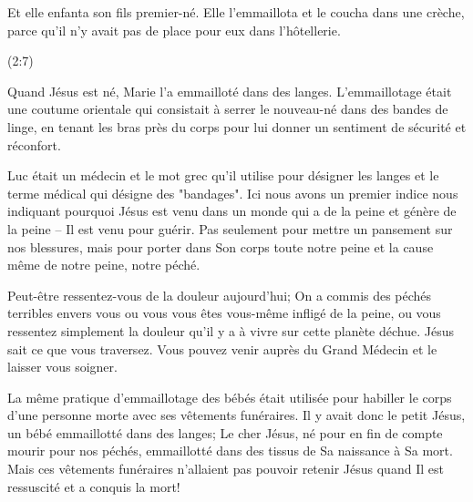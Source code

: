 
\epigraph{%
Et elle enfanta son fils premier-né. Elle l'emmaillota et le coucha dans une crèche, parce qu'il n'y avait pas de place pour eux dans l'hôtellerie.}{(2:7)}

Quand Jésus est né, Marie l'a emmailloté dans des langes. L'emmaillotage était une coutume orientale qui consistait à serrer le nouveau-né dans des bandes de linge, en tenant les bras près du corps pour lui donner un sentiment de sécurité et réconfort.

Luc était un médecin et le mot grec qu'il utilise pour désigner les langes et le terme médical qui désigne des "bandages". Ici nous avons un premier indice nous indiquant pourquoi Jésus est venu dans un monde qui a de la peine et génère de la peine – Il est venu pour guérir. Pas seulement pour mettre un pansement sur nos blessures, mais pour porter dans Son corps toute notre peine et la cause même de notre peine, notre péché.

Peut-être ressentez-vous de la douleur aujourd'hui; On a commis des péchés terribles envers vous ou vous vous êtes vous-même infligé de la peine, ou vous ressentez simplement la douleur qu'il y a à vivre sur cette planète déchue. Jésus sait ce que vous traversez. Vous pouvez venir auprès du Grand Médecin et le laisser vous soigner.

La même pratique d'emmaillotage des bébés était utilisée pour habiller le corps d'une personne morte avec ses vêtements funéraires. Il y avait donc le petit Jésus, un bébé emmaillotté dans des langes; Le cher Jésus, né pour en fin de compte mourir pour nos péchés, emmaillotté dans des tissus de Sa naissance à Sa mort. Mais ces vêtements funéraires n'allaient pas pouvoir retenir Jésus quand Il est ressuscité et a conquis la mort!



